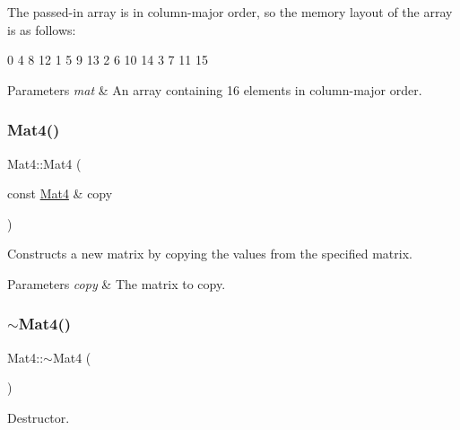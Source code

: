 The passed-\/in array is in column-\/major order, so the memory layout of the array is as follows\+: \begin{DoxyVerb}0   4   8   12
1   5   9   13
2   6   10  14
3   7   11  15
\end{DoxyVerb}



\begin{DoxyParams}{Parameters}
{\em mat} & An array containing 16 elements in column-\/major order. \\
\hline
\end{DoxyParams}
\mbox{\label{classMat4_a67ddcbb4713bb335042aef3b14324456}} 
\subsubsection{\texorpdfstring{Mat4()}{Mat4()}\hspace{0.1cm}{\footnotesize\ttfamily [4/8]}}
{\footnotesize\ttfamily Mat4\+::\+Mat4 (\begin{DoxyParamCaption}\item[{const \hyperlink{classMat4}{Mat4} \&}]{copy }\end{DoxyParamCaption})}

Constructs a new matrix by copying the values from the specified matrix.


\begin{DoxyParams}{Parameters}
{\em copy} & The matrix to copy. \\
\hline
\end{DoxyParams}
\mbox{\label{classMat4_a72fac55214c733b56248d2b321aaf69b}} 
\subsubsection{\texorpdfstring{$\sim$\+Mat4()}{~Mat4()}\hspace{0.1cm}{\footnotesize\ttfamily [1/2]}}
{\footnotesize\ttfamily Mat4\+::$\sim$\+Mat4 (\begin{DoxyParamCaption}{ }\end{DoxyParamCaption})}

Destructor. \mbox{\label{classMat4_a53cb3c6c2a0b594345f0107b6c1fcc37}} 
